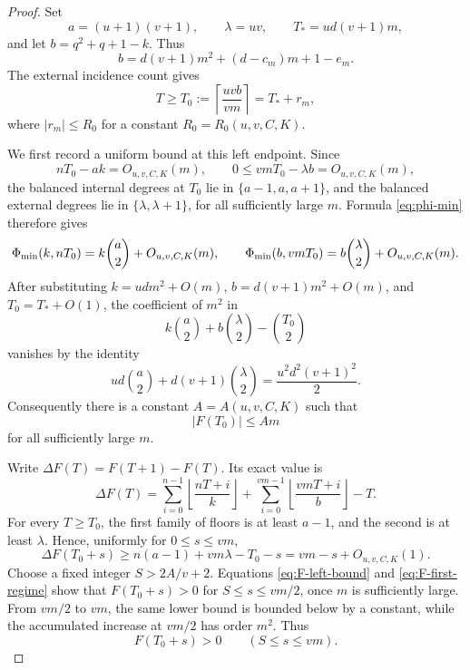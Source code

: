 \begin{proof}
Set
\[
 a=(u+1)(v+1),\qquad \lambda=uv,\qquad
 T_*=ud(v+1)m,
\]
and let \(b=q^2+q+1-k\).  Thus
\[
 b=d(v+1)m^2+(d-c_m)m+1-e_m.
\]
The external incidence count gives
\begin{equation}\label{eq:T-minimum}
 T\ge T_0:=\left\lceil\frac{uvb}{vm}\right\rceil
 =T_*+r_m,
\end{equation}
where \(|r_m|\le R_0\) for a constant \(R_0=R_0(u,v,C,K)\).

We first record a uniform bound at this left endpoint.  Since
\[
 nT_0-ak=O_{u,v,C,K}(m),\qquad
 0\le vmT_0-\lambda b=O_{u,v,C,K}(m),
\]
the balanced internal degrees at \(T_0\) lie in \(\{a-1,a,a+1\}\),
and the balanced external degrees lie in \(\{\lambda,\lambda+1\}\), for
all sufficiently large \(m\).  Formula \eqref{eq:phi-min} therefore gives
\[
 \Phi_{\min}(k,nT_0)=k\binom a2+O_{u,v,C,K}(m),\qquad
 \Phi_{\min}(b,vmT_0)=b\binom\lambda2+O_{u,v,C,K}(m).
\]
After substituting \(k=udm^2+O(m)\),
\(b=d(v+1)m^2+O(m)\), and \(T_0=T_*+O(1)\), the coefficient of \(m^2\)
in
\[
 k\binom a2+b\binom\lambda2-\binom{T_0}2
\]
vanishes by the identity
\[
 ud\binom a2+d(v+1)\binom\lambda2
 =\frac{u^2d^2(v+1)^2}{2}.
\]
Consequently there is a constant
\(A=A(u,v,C,K)\) such that
\begin{equation}\label{eq:F-left-bound}
 |F(T_0)|\le Am
\end{equation}
for all sufficiently large \(m\).

Write \(\Delta F(T)=F(T+1)-F(T)\).  Its exact value is
\begin{equation}\label{eq:F-difference}
 \Delta F(T)
 =\sum_{i=0}^{n-1}\left\lfloor\frac{nT+i}{k}\right\rfloor
 +\sum_{i=0}^{vm-1}\left\lfloor\frac{vmT+i}{b}\right\rfloor-T.
\end{equation}
For every \(T\ge T_0\), the first family of floors is at least \(a-1\),
and the second is at least \(\lambda\).  Hence, uniformly for
\(0\le s\le vm\),
\begin{equation}\label{eq:F-first-regime}
 \Delta F(T_0+s)
 \ge n(a-1)+vm\lambda-T_0-s
 =vm-s+O_{u,v,C,K}(1).
\end{equation}
Choose a fixed integer \(S>2A/v+2\).  Equations
\eqref{eq:F-left-bound} and \eqref{eq:F-first-regime} show that
\(F(T_0+s)>0\) for \(S\le s\le vm/2\), once \(m\) is sufficiently large.
From \(vm/2\) to \(vm\), the same lower bound is bounded below by a
constant, while the accumulated increase at \(vm/2\) has order \(m^2\).
Thus
\begin{equation}\label{eq:F-positive-first-regime}
 F(T_0+s)>0\qquad(S\le s\le vm).
\end{equation}


\end{proof}
